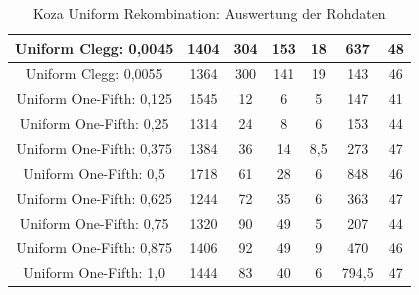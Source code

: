 \begin{table}[H]
\begin{tabular}{c | c | c | c | c | c | c}
		\hline
		Uniform Clegg: 0,0045 & 1404 & 304 & 153 & 18 & 637 & 48\\
		\hline
		Uniform Clegg: 0,0055 & 1364 & 300 & 141 & 19 & 143 & 46\\
		\hline
		Uniform One-Fifth: 0,125 & 1545 & 12 & 6 & 5 & 147 & 41\\
		\hline
		Uniform One-Fifth: 0,25 & 1314 & 24 & 8 & 6 & 153 & 44\\
		\hline
		Uniform One-Fifth: 0,375 & 1384 & 36 & 14 & 8,5 & 273 & 47\\
		\hline
		Uniform One-Fifth: 0,5 & 1718 & 61 & 28 & 6 & 848 & 46\\
		\hline
		Uniform One-Fifth: 0,625 & 1244 & 72 & 35 & 6 & 363 & 47\\
		\hline
		Uniform One-Fifth: 0,75 & 1320 & 90 & 49 & 5 & 207 & 44\\
		\hline
		Uniform One-Fifth: 0,875 & 1406 & 92 & 49 & 9 & 470 & 46\\
		\hline
		Uniform One-Fifth: 1,0 & 1444 & 83 & 40 & 6 & 794,5 & 47\\
	\end{tabular}
	\caption{Koza Uniform Rekombination: Auswertung der Rohdaten}
	\label{table:kozaUniformRohdaten}
\end{table}

